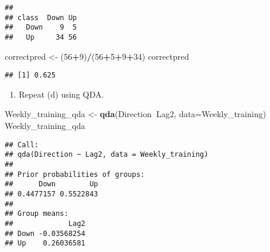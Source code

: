 \documentclass[]{article}
\newenvironment{Shaded}{\begin{snugshade}}{\end{snugshade}}
\newcommand{\KeywordTok}[1]{\textcolor[rgb]{0.13,0.29,0.53}{\textbf{#1}}}
\newcommand{\DataTypeTok}[1]{\textcolor[rgb]{0.13,0.29,0.53}{#1}}
\newcommand{\DecValTok}[1]{\textcolor[rgb]{0.00,0.00,0.81}{#1}}
\newcommand{\StringTok}[1]{\textcolor[rgb]{0.31,0.60,0.02}{#1}}
\newcommand{\CommentTok}[1]{\textcolor[rgb]{0.56,0.35,0.01}{\textit{#1}}}
\newcommand{\OperatorTok}[1]{\textcolor[rgb]{0.81,0.36,0.00}{\textbf{#1}}}
\newcommand{\NormalTok}[1]{#1}
\providecommand{\tightlist}{%
  \setlength{\itemsep}{0pt}\setlength{\parskip}{0pt}}
\begin{document}
\begin{Shaded}
\end{Shaded}

\begin{verbatim}
##       
## class  Down Up
##   Down    9  5
##   Up     34 56
\end{verbatim}

\begin{Shaded}
\begin{Highlighting}[]
\NormalTok{correctpred <-}\StringTok{ }\NormalTok{(}\DecValTok{56}\OperatorTok{+}\DecValTok{9}\NormalTok{)}\OperatorTok{/}\NormalTok{(}\DecValTok{56}\OperatorTok{+}\DecValTok{5}\OperatorTok{+}\DecValTok{9}\OperatorTok{+}\DecValTok{34}\NormalTok{)}
\NormalTok{correctpred}
\end{Highlighting}
\end{Shaded}

\begin{verbatim}
## [1] 0.625
\end{verbatim}

\begin{enumerate}
\def\labelenumi{(\alph{enumi})}
\setcounter{enumi}{5}
\tightlist
\item
  Repeat (d) using QDA.
\end{enumerate}

\begin{Shaded}
\begin{Highlighting}[]
\NormalTok{Weekly_training_qda <-}\StringTok{ }\KeywordTok{qda}\NormalTok{(Direction}\OperatorTok{~}\NormalTok{Lag2, }\DataTypeTok{data=}\NormalTok{Weekly_training)}
\NormalTok{Weekly_training_qda}
\end{Highlighting}
\end{Shaded}

\begin{verbatim}
## Call:
## qda(Direction ~ Lag2, data = Weekly_training)
## 
## Prior probabilities of groups:
##      Down        Up 
## 0.4477157 0.5522843 
## 
## Group means:
##             Lag2
## Down -0.03568254
## Up    0.26036581
\end{verbatim}
\end{document}
